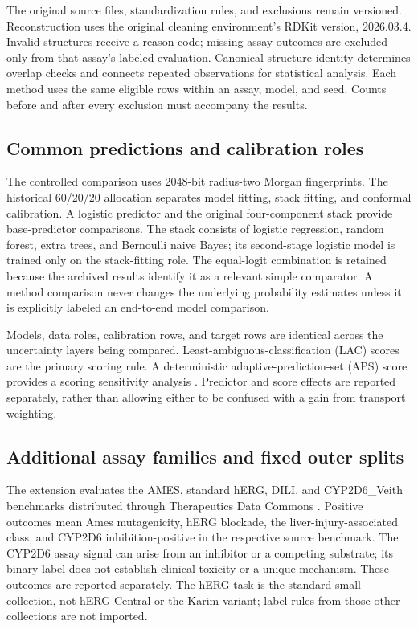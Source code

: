 \documentclass[11pt]{article}
\begin{document}
The original source files, standardization rules, and exclusions remain versioned. Reconstruction uses the original cleaning environment's RDKit version, 2026.03.4. Invalid structures receive a reason code; missing assay outcomes are excluded only from that assay's labeled evaluation. Canonical structure identity determines overlap checks and connects repeated observations for statistical analysis. Each method uses the same eligible rows within an assay, model, and seed. Counts before and after every exclusion must accompany the results.

\subsection{Common predictions and calibration roles}
The controlled comparison uses 2048-bit radius-two Morgan fingerprints. The historical 60/20/20 allocation separates model fitting, stack fitting, and conformal calibration. A logistic predictor and the original four-component stack provide base-predictor comparisons. The stack consists of logistic regression, random forest, extra trees, and Bernoulli naive Bayes; its second-stage logistic model is trained only on the stack-fitting role. The equal-logit combination is retained because the archived results identify it as a relevant simple comparator. A method comparison never changes the underlying probability estimates unless it is explicitly labeled an end-to-end model comparison.

Models, data roles, calibration rows, and target rows are identical across the uncertainty layers being compared. Least-ambiguous-classification (LAC) scores are the primary scoring rule. A deterministic adaptive-prediction-set (APS) score provides a scoring sensitivity analysis \citep{romano2020}. Predictor and score effects are reported separately, rather than allowing either to be confused with a gain from transport weighting.

\subsection{Additional assay families and fixed outer splits}
The extension evaluates the AMES, standard hERG, DILI, and CYP2D6\_Veith benchmarks distributed through Therapeutics Data Commons \citep{ames2012,herg2016,dili2015,veith2009}. Positive outcomes mean Ames mutagenicity, hERG blockade, the liver-injury-associated class, and CYP2D6 inhibition-positive in the respective source benchmark. The CYP2D6 assay signal can arise from an inhibitor or a competing substrate; its binary label does not establish clinical toxicity or a unique mechanism. These outcomes are reported separately. The hERG task is the standard small collection, not hERG Central or the Karim variant; label rules from those other collections are not imported.
\end{document}
